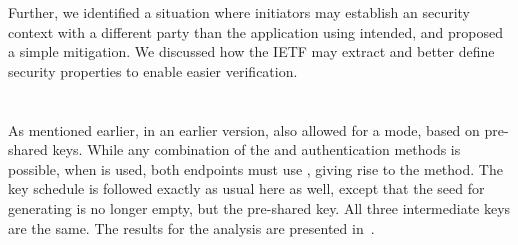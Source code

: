 \documentclass[runningheads, envcountsame, hidelinks, a4paper, draft, x11names]{llncs}
\begin{document}
Further, we identified a situation where initiators may establish an \mOscore{}
security context with a different party than the application using \mEdhoc{}
intended, and proposed a simple mitigation.
%
We discussed how the IETF may extract and better define security properties to
enable easier verification.
%
%





\appendix

\section{\mPsk}
\label{sec:appendixPsk}
As mentioned earlier, in an earlier version, \mEdhoc{} also allowed for a \mPsk{} mode, based on pre-shared keys. While any combination of the \mSig{} and \mStat{} authentication methods is possible,
when \mPsk{} is used, both endpoints must use \mPsk{}, giving rise to the \mPskPsk{} method. The key schedule is followed exactly as usual here as well, except that the seed for generating \mPRKtwo is no longer empty, but the pre-shared key. All three intermediate keys are the same. The results for the analysis are presented in~\cite{edhocTamarinRepo}.

\end{document}
